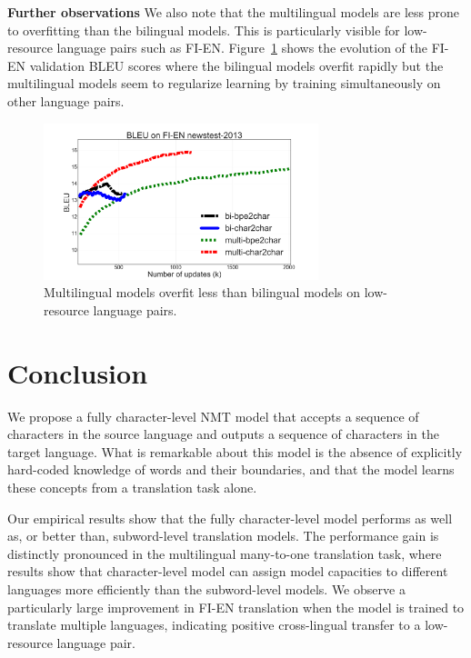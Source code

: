 \documentclass[11pt,letterpaper]{article}
\newcommand{\tb}{\textbf}
\begin{document}
\noindent\tb{Further observations} We also note that the multilingual models are less prone to overfitting than the bilingual models. This is particularly visible for low-resource language pairs such as FI-EN. Figure~\ref{figure:overfit} shows the evolution of the FI-EN validation BLEU scores where the bilingual models overfit rapidly but the multilingual models seem to regularize learning by training simultaneously on other language pairs.\\

\begin{figure}[h!]
\centering
\hspace{-6mm}
\includegraphics[width=80mm]{overfit7.png}
\caption{Multilingual models overfit less than bilingual models on low-resource language pairs.}
\label{figure:overfit}
\vspace{-4mm}
\end{figure}

\section{Conclusion}\label{sec:end}

We propose a fully character-level NMT model that accepts a sequence of characters in the source language and outputs a sequence of characters in the target language. What is remarkable about this model is the absence of explicitly hard-coded knowledge of words and their boundaries, and that the model learns these concepts from a translation task alone.

Our empirical results show that the fully character-level model performs as well as, or better than, subword-level translation models. The performance gain is distinctly pronounced in the multilingual many-to-one translation task, where results show that character-level model can assign model capacities to different languages more efficiently than the subword-level models. We observe a particularly large improvement in FI-EN translation when the model is trained to translate multiple languages, indicating positive cross-lingual transfer to a low-resource language pair.
\end{document}
